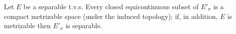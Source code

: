 Let $E$ be a separable t.v.s. Every closed equicontinuous subset of $E'_{\sigma}$ is a compact metrizable space (under the induced topology); if, in addition, $E$ is metrizable then $E'_{\sigma}$ is separable.
